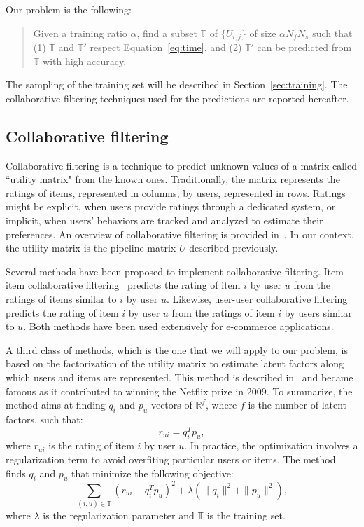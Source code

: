\documentclass[10pt, conference, compsocconf]{IEEEtran}
\begin{document}
Our problem is the following:
\begin{quote}
Given a training ratio $\alpha$, find a subset $\mathbb{T}$ of 
$\{U_{i,j}\}$ of size $\alpha N_f N_s$ such that (1) $\mathbb{T}$ and 
$\mathbb{T'}$ respect Equation~\ref{eq:time}, and (2) $\mathbb{T'}$ can 
be predicted from $\mathbb{T}$ with high accuracy.
\end{quote}
The sampling of the training set will be described in Section~\ref{sec:training}.
The collaborative filtering techniques used for the predictions are reported hereafter.

\subsection{Collaborative filtering}

Collaborative filtering is a technique to predict unknown values of a 
matrix called ``utility matrix" from the known ones. Traditionally, the 
matrix represents the ratings of items, represented in columns, by 
users, represented in rows. Ratings might be explicit, when users 
provide ratings through a dedicated system, or implicit, when users' 
behaviors are tracked and analyzed to estimate their preferences. An 
overview of collaborative filtering is provided 
in~\cite{leskovec2014mining}. In our context, the utility matrix is the
pipeline matrix $U$ described previously.

Several methods have been proposed to implement collaborative 
filtering. Item-item collaborative filtering~\cite{breese1998empirical, linden2003amazon} predicts 
the rating of item $i$ by user $u$ from the ratings of items similar to 
$i$ by user $u$. Likewise, user-user collaborative 
filtering~\cite{breese1998empirical} predicts the rating of item $i$ by user $u$ 
from the ratings of item $i$ by users similar to $u$. Both methods
have been used extensively for e-commerce applications.

A third class of methods, which is the one that we will apply to our 
problem, is based on the factorization of the utility matrix to 
estimate latent factors along which users and items are represented. 
This method is described 
in~\cite{koren2009matrix} and became famous as it contributed to winning the 
Netflix prize in 2009. To summarize, the method aims at finding $q_i$ 
and $p_u$ vectors of $\mathbb{R}^f$, where $f$ is the number of latent factors, such that:
\begin{equation*}
r_{ui} = q_i^Tp_u,
\end{equation*}
where $r_{ui}$ is the rating of item $i$ by user $u$. In practice, the optimization
involves a regularization term to avoid overfiting particular users or items. The method
finds $q_i$ and $p_u$ that minimize the following objective:
\begin{equation*}
\sum_{(i,u) \in \mathbb{T}}\left( r_{ui} - q_i^Tp_u\right)^2+\lambda \left( \|{q_i}\|^2 + \|{p_u}\|^2\right)
,
\end{equation*}
where $\lambda$ is the regularization parameter and $\mathbb{T}$ is the training set.
\end{document}
